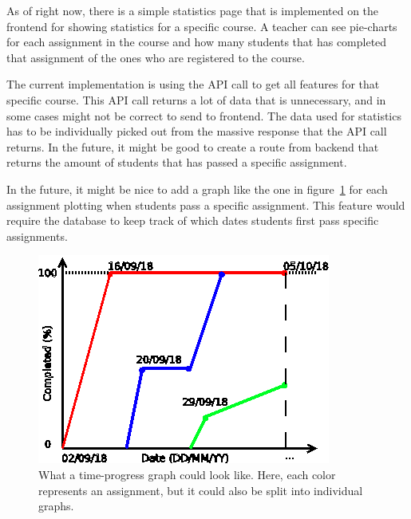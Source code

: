 As of right now, there is a simple statistics page that is implemented on the frontend for showing statistics for a specific course. A teacher can see pie-charts for each assignment in the course and how many students that has completed that assignment of the ones who are registered to the course.

The current implementation is using the API call to get all features for that specific course. This API call returns a lot of data that is unnecessary, and in some cases might not be correct to send to frontend. The data used for statistics has to be individually picked out from the massive response that the API call returns. In the future, it might be good to create a route from backend that returns the amount of students that has passed a specific assignment.

In the future, it might be nice to add a graph like the one in figure~\ref{fig:progovertime} for each assignment plotting when students pass a specific assignment. This feature would require the database to keep track of which dates students first pass specific assignments.
\begin{figure}[hb]
    \centering
    \includegraphics[width=.6\linewidth]{img_src/progress_over_time.png}
    \caption{What a time-progress graph could look like. Here, each color represents an assignment, but it could also be split into individual graphs.}\label{fig:progovertime}
\end{figure}

